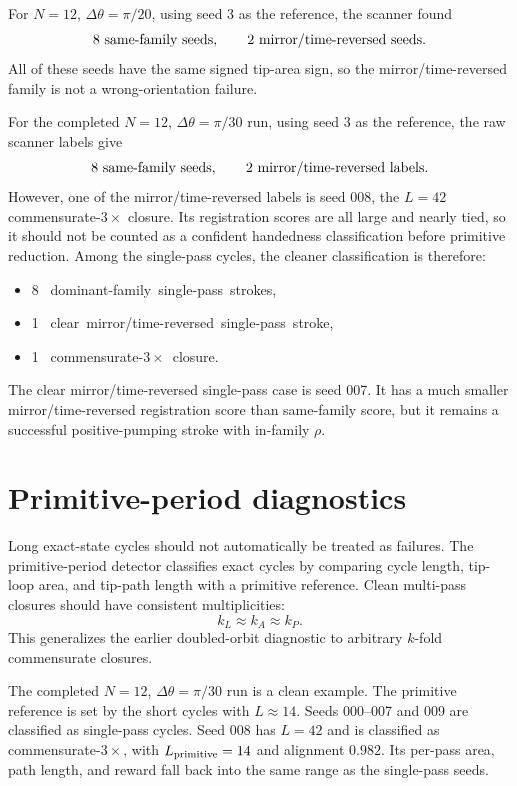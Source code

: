 \documentclass[11pt]{article}
\newcommand{\dth}{\Delta\theta}
\begin{document}
For $N=12$, $\dth=\pi/20$, using seed 3 as the reference, the scanner found
\[
8 \hbox{ same-family seeds}, \qquad 2 \hbox{ mirror/time-reversed seeds}.
\]
All of these seeds have the same signed tip-area sign, so the mirror/time-reversed family is not a wrong-orientation failure.

For the completed $N=12$, $\dth=\pi/30$ run, using seed 3 as the reference, the raw scanner labels give
\[
8 \hbox{ same-family seeds}, \qquad 2 \hbox{ mirror/time-reversed labels}.
\]
However, one of the mirror/time-reversed labels is seed 008, the $L=42$ commensurate-$3\times$ closure. Its registration scores are all large and nearly tied, so it should not be counted as a confident handedness classification before primitive reduction. Among the single-pass cycles, the cleaner classification is therefore:
\begin{itemize}
\item 8 \hbox{ dominant-family single-pass strokes}, \qquad
\item 1 \hbox{ clear mirror/time-reversed single-pass stroke}, \qquad
\item 1 \hbox{ commensurate-$3\times$ closure}.
\end{itemize}
The clear mirror/time-reversed single-pass case is seed 007. It has a much smaller mirror/time-reversed registration score than same-family score, but it remains a successful positive-pumping stroke with in-family $\rho$.

\section{Primitive-period diagnostics}

Long exact-state cycles should not automatically be treated as failures. The primitive-period detector classifies exact cycles by comparing cycle length, tip-loop area, and tip-path length with a primitive reference. Clean multi-pass closures should have consistent multiplicities:
\[
k_L \approx k_A \approx k_P .
\]
This generalizes the earlier doubled-orbit diagnostic to arbitrary $k$-fold commensurate closures.

The completed $N=12$, $\dth=\pi/30$ run is a clean example. The primitive reference is set by the short cycles with $L\approx 14$. Seeds 000--007 and 009 are classified as single-pass cycles. Seed 008 has $L=42$ and is classified as commensurate-$3\times$, with $L_{\rm primitive}=14$ and alignment $0.982$. Its per-pass area, path length, and reward fall back into the same range as the single-pass seeds.
\end{document}
